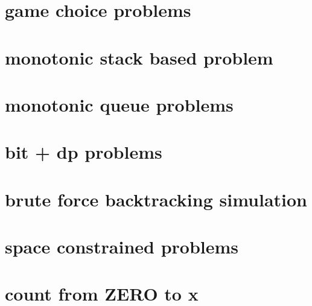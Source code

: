 \chapter{game choice problems}

\chapter{monotonic stack based problem}
\chapter{monotonic queue problems}
\chapter{bit + dp problems}
\chapter{brute force backtracking simulation}
\chapter{space constrained problems}
\chapter{count from ZERO to x}


